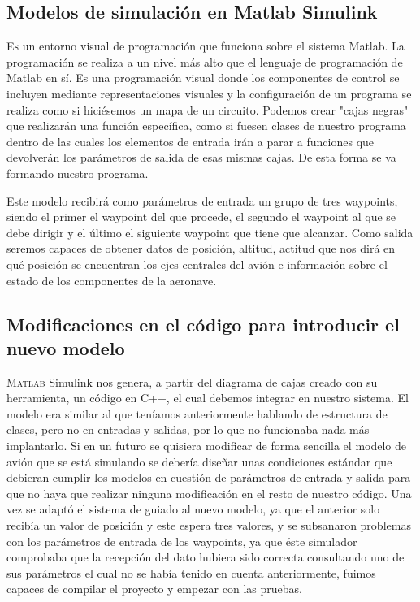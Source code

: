 \documentclass[12pt,a4paper,spanish]{book} %
\begin{document}
\subsection{Modelos de simulación en Matlab Simulink}

\lettrine{E}{s} un entorno visual de programación que funciona sobre el sistema Matlab. La programación se realiza a un nivel más alto que el lenguaje de programación de Matlab en sí. Es una programación visual donde los componentes de control se incluyen mediante representaciones visuales y la configuración de un programa se realiza como si hiciésemos un mapa de un circuito. Podemos crear "cajas negras" que realizarán una función específica, como si fuesen clases de nuestro programa dentro de las cuales los elementos de entrada irán a parar a funciones que devolverán los parámetros de salida de esas mismas cajas. De esta forma se va formando nuestro programa. 

Este modelo recibirá como parámetros de entrada un grupo de tres waypoints, siendo el primer el waypoint del que procede, el segundo el waypoint al que se debe dirigir y el último el siguiente waypoint que tiene que alcanzar. Como salida seremos capaces de obtener datos de posición, altitud, actitud que nos dirá en qué posición se encuentran los ejes centrales del avión e información sobre el estado de los componentes de la aeronave.

\subsection{Modificaciones en el código para introducir el nuevo modelo}

\lettrine{M}{atlab} Simulink nos genera, a partir del diagrama de cajas creado con su herramienta, un código en C++, el cual debemos integrar en nuestro sistema. El modelo era similar al que teníamos anteriormente hablando de estructura de clases, pero no en entradas y salidas, por lo que no funcionaba nada más implantarlo. Si en un futuro se quisiera modificar de forma sencilla el modelo de avión que se está simulando se debería diseñar unas condiciones estándar que debieran cumplir los modelos en cuestión de parámetros de entrada y salida para que no haya que realizar ninguna modificación en el resto de nuestro código. Una vez se adaptó el sistema de guiado al nuevo modelo, ya que el anterior solo recibía un valor de posición y este espera tres valores, y se subsanaron problemas con los parámetros de entrada de los waypoints, ya que éste simulador comprobaba que la recepción del dato hubiera sido correcta consultando uno de sus parámetros el cual no se había tenido en cuenta anteriormente, fuimos capaces de compilar el proyecto y empezar con las pruebas.
\end{document}
